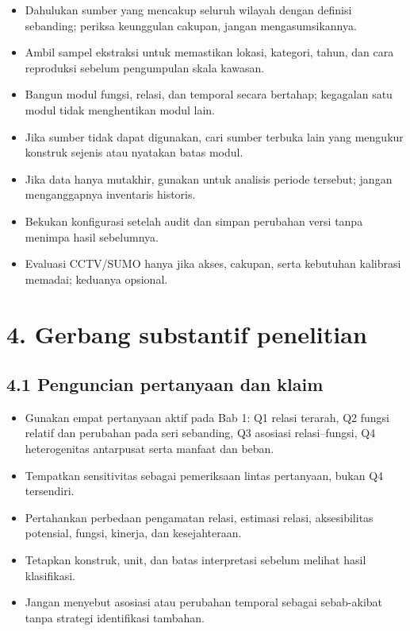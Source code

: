\documentclass[
  indonesian,
  11pt,
]{article}
\providecommand{\tightlist}{%
  \setlength{\itemsep}{0pt}\setlength{\parskip}{0pt}}
\renewcommand{\tightlist}{%
  \setlength{\itemsep}{0.22em}%
  \setlength{\parskip}{0pt}%
}
\begin{document}
\begin{itemize}
\tightlist
\item[$\square$]
  Dahulukan sumber yang mencakup seluruh wilayah dengan definisi
  sebanding; periksa keunggulan cakupan, jangan mengasumsikannya.
\item[$\square$]
  Ambil sampel ekstraksi untuk memastikan lokasi, kategori, tahun, dan
  cara reproduksi sebelum pengumpulan skala kawasan.
\item[$\square$]
  Bangun modul fungsi, relasi, dan temporal secara bertahap; kegagalan
  satu modul tidak menghentikan modul lain.
\item[$\square$]
  Jika sumber tidak dapat digunakan, cari sumber terbuka lain yang
  mengukur konstruk sejenis atau nyatakan batas modul.
\item[$\square$]
  Jika data hanya mutakhir, gunakan untuk analisis periode tersebut;
  jangan menganggapnya inventaris historis.
\item[$\square$]
  Bekukan konfigurasi setelah audit dan simpan perubahan versi tanpa
  menimpa hasil sebelumnya.
\item[$\square$]
  Evaluasi CCTV/SUMO hanya jika akses, cakupan, serta kebutuhan
  kalibrasi memadai; keduanya opsional.
\end{itemize}

\section{4. Gerbang substantif
penelitian}\label{gerbang-substantif-penelitian}

\subsection{4.1 Penguncian pertanyaan dan
klaim}\label{penguncian-pertanyaan-dan-klaim}

\begin{itemize}
\tightlist
\item[$\square$]
  Gunakan empat pertanyaan aktif pada Bab 1: Q1 relasi terarah, Q2
  fungsi relatif dan perubahan pada seri sebanding, Q3 asosiasi
  relasi--fungsi, Q4 heterogenitas antarpusat serta manfaat dan beban.
\item[$\square$]
  Tempatkan sensitivitas sebagai pemeriksaan lintas pertanyaan, bukan Q4
  tersendiri.
\item[$\square$]
  Pertahankan perbedaan pengamatan relasi, estimasi relasi,
  aksesibilitas potensial, fungsi, kinerja, dan kesejahteraan.
\item[$\square$]
  Tetapkan konstruk, unit, dan batas interpretasi sebelum melihat hasil
  klasifikasi.
\item[$\square$]
  Jangan menyebut asosiasi atau perubahan temporal sebagai sebab-akibat
  tanpa strategi identifikasi tambahan.
\end{itemize}
\end{document}
